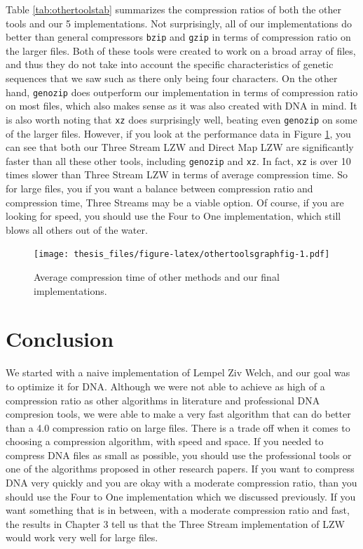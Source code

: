 \documentclass[12pt,twoside]{reedthesis}
\begin{document}
Table \ref{tab:othertoolstab} summarizes the compression ratios of both the other tools and our 5 implementations. Not surprisingly, all of our implementations do better than general compressors \texttt{bzip} and \texttt{gzip} in terms of compression ratio on the larger files. Both of these tools were created to work on a broad array of files, and thus they do not take into account the specific characteristics of genetic sequences that we saw such as there only being four characters. On the other hand, \texttt{genozip} does outperform our implementation in terms of compression ratio on most files, which also makes sense as it was also created with DNA in mind. It is also worth noting that \texttt{xz} does surprisingly well, beating even \texttt{genozip} on some of the larger files. However, if you look at the performance data in Figure \ref{fig:othertoolsgraphfig}, you can see that both our Three Stream LZW and Direct Map LZW are significantly faster than all these other tools, including \texttt{genozip} and \texttt{xz}. In fact, \texttt{xz} is over 10 times slower than Three Stream LZW in terms of average compression time. So for large files, you if you want a balance between compression ratio and compression time, Three Streams may be a viable option. Of course, if you are looking for speed, you should use the Four to One implementation, which still blows all others out of the water.
\begin{figure}
\centering
\texttt{[image: thesis\_files/figure-latex/othertoolsgraphfig-1.pdf]}
\caption{\label{fig:othertoolsgraphfig}Average compression time of other methods and our final implementations.}
\end{figure}
\hypertarget{conclusion}{%
\chapter*{Conclusion}\label{conclusion}}

We started with a naive implementation of Lempel Ziv Welch, and our goal was to optimize it for DNA. Although we were not able to achieve as high of a compression ratio as other algorithms in literature and professional DNA compresion tools, we were able to make a very fast algorithm that can do better than a 4.0 compression ratio on large files. There is a trade off when it comes to choosing a compression algorithm, with speed and space. If you needed to compress DNA files as small as possible, you should use the professional tools or one of the algorithms proposed in other research papers. If you want to compress DNA very quickly and you are okay with a moderate compression ratio, than you should use the Four to One implementation which we discussed previously. If you want something that is in between, with a moderate compression ratio and fast, the results in Chapter 3 tell us that the Three Stream implementation of LZW would work very well for large files.
\end{document}

